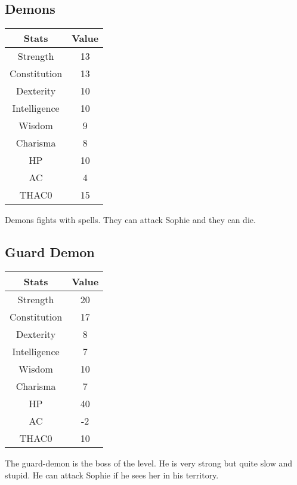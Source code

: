 \subsection{Demons}
\begin{table}[H]
\begin{tabular}{|c|c|}
\hline
\rowcolor[HTML]{C0C0C0} 
\textbf{Stats} & \textbf{Value} \\ \hline
Strength & 13 \\ \hline
Constitution & 13 \\ \hline
Dexterity & 10 \\ \hline
Intelligence & 10 \\ \hline
Wisdom & 9 \\ \hline
Charisma & 8 \\ \hline
HP & 10 \\ \hline
AC & 4 \\ \hline
THAC0 & 15 \\ \hline
\end{tabular}
\end{table}
Demons fights with spells. They can attack Sophie and they can die. 
​\subsection{Guard Demon}
\begin{table}[H]
\begin{tabular}{|c|c|}
\hline
\rowcolor[HTML]{C0C0C0} 
\textbf{Stats} & \textbf{Value} \\ \hline
Strength & 20 \\ \hline
Constitution & 17 \\ \hline
Dexterity & 8 \\ \hline
Intelligence & 7 \\ \hline
Wisdom & 10 \\ \hline
Charisma & 7 \\ \hline
HP & 40 \\ \hline
AC & -2 \\ \hline
THAC0 & 10 \\ \hline
\end{tabular}
\end{table}
The guard-demon is the boss of the level. He is very strong but quite slow and stupid.
He can attack Sophie if he sees her in his territory. 
